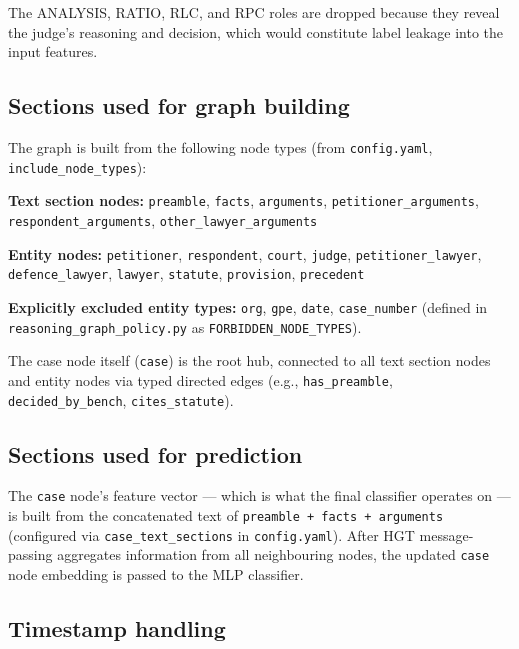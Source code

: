 \documentclass[12pt,a4paper]{article}
\begin{document}
The ANALYSIS, RATIO, RLC, and RPC roles are dropped because they reveal the judge's reasoning and decision, which would constitute label leakage into the input features.

\subsection{Sections used for graph building}

The graph is built from the following node types (from \texttt{config.yaml}, \texttt{include\_node\_types}):

\textbf{Text section nodes:} \texttt{preamble}, \texttt{facts}, \texttt{arguments}, \texttt{petitioner\_\allowbreak arguments}, \texttt{respondent\_\allowbreak arguments}, \texttt{other\_lawyer\_\allowbreak arguments}

\textbf{Entity nodes:} \texttt{petitioner}, \texttt{respondent}, \texttt{court}, \texttt{judge}, \texttt{petitioner\_lawyer}, \texttt{defence\_lawyer}, \texttt{lawyer}, \texttt{statute}, \texttt{provision}, \texttt{precedent}

\textbf{Explicitly excluded entity types:} \texttt{org}, \texttt{gpe}, \texttt{date}, \texttt{case\_number} (defined in \texttt{reasoning\_graph\_policy.py} as \texttt{FORBIDDEN\_NODE\_TYPES}).

The case node itself (\texttt{case}) is the root hub, connected to all text section nodes and entity nodes via typed directed edges (e.g., \texttt{has\_preamble}, \texttt{decided\_by\_bench}, \texttt{cites\_statute}).

\subsection{Sections used for prediction}

The \texttt{case} node's feature vector — which is what the final classifier operates on — is built from the concatenated text of \texttt{preamble + facts + arguments} (configured via \texttt{case\_text\_sections} in \texttt{config.yaml}). After HGT message-passing aggregates information from all neighbouring nodes, the updated \texttt{case} node embedding is passed to the MLP classifier.

\subsection{Timestamp handling}
\end{document}
